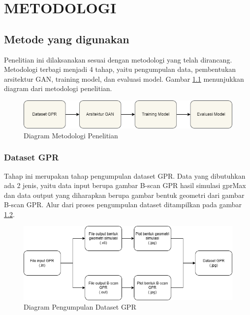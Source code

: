 \chapter{METODOLOGI}
\label{chap:metodologi}

\section{Metode yang digunakan}
\label{sec:metode}

Penelitian ini dilaksanakan sesuai dengan metodologi yang telah dirancang. 
Metodologi terbagi menjadi 4 tahap, yaitu pengumpulan data, pembentukan arsitektur GAN, training model, dan evaluasi model. 
Gambar \ref{fig:metodologi} menunjukkan diagram dari metodologi penelitian.

\begin{figure}[ht]
  \centering
  \includegraphics[scale=0.7]{gambar/metodologi.png}
  \caption{Diagram Metodologi Penelitian}
  \label{fig:metodologi}
\end{figure}

\subsection{Dataset GPR}
\label{subsec:datasetgpr}

Tahap ini merupakan tahap pengumpulan dataset GPR. 
Data yang dibutuhkan ada 2 jenis, yaitu data input berupa gambar B-scan GPR hasil simulasi gprMax dan data output yang diharapkan berupa gambar bentuk geometri dari gambar B-scan GPR. 
Alur dari proses pengumpulan dataset ditampilkan pada gambar \ref{fig:datasetgpr}.

\begin{figure}[ht]
  \centering
  \includegraphics[scale=0.7]{gambar/alur pengumpulan data.png}
  \caption{Diagram Pengumpulan Dataset GPR}
  \label{fig:datasetgpr}
\end{figure}

